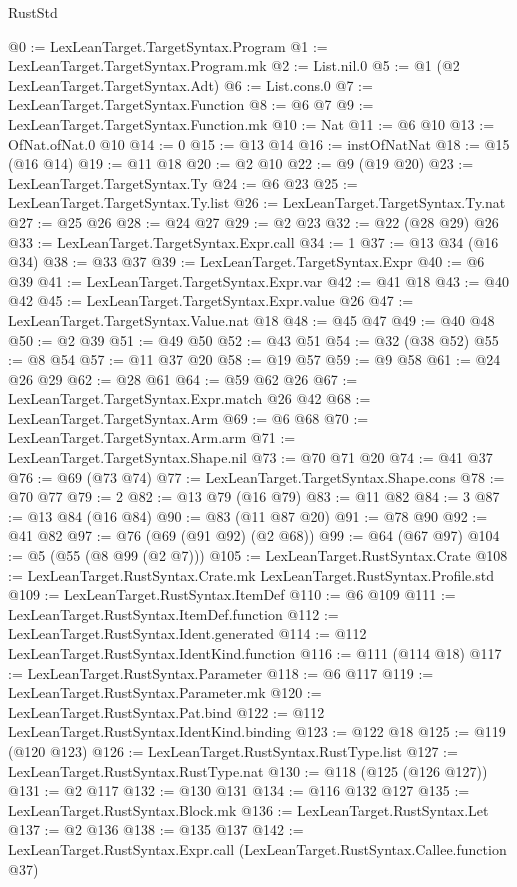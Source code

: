 \begin{lexlean}{RustStd}
\begin{coremodule}
{\begin{coremodule}
{{{{{{@0 := LexLeanTarget.TargetSyntax.Program
@1 := LexLeanTarget.TargetSyntax.Program.mk
@2 := List.nil.{0}
@5 := @1 (@2 LexLeanTarget.TargetSyntax.Adt)
@6 := List.cons.{0}
@7 := LexLeanTarget.TargetSyntax.Function
@8 := @6 @7
@9 := LexLeanTarget.TargetSyntax.Function.mk
@10 := Nat
@11 := @6 @10
@13 := OfNat.ofNat.{0} @10
@14 := 0
@15 := @13 @14
@16 := instOfNatNat
@18 := @15 (@16 @14)
@19 := @11 @18
@20 := @2 @10
@22 := @9 (@19 @20)
@23 := LexLeanTarget.TargetSyntax.Ty
@24 := @6 @23
@25 := LexLeanTarget.TargetSyntax.Ty.list
@26 := LexLeanTarget.TargetSyntax.Ty.nat
@27 := @25 @26
@28 := @24 @27
@29 := @2 @23
@32 := @22 (@28 @29) @26
@33 := LexLeanTarget.TargetSyntax.Expr.call
@34 := 1
@37 := @13 @34 (@16 @34)
@38 := @33 @37
@39 := LexLeanTarget.TargetSyntax.Expr
@40 := @6 @39
@41 := LexLeanTarget.TargetSyntax.Expr.var
@42 := @41 @18
@43 := @40 @42
@45 := LexLeanTarget.TargetSyntax.Expr.value @26
@47 := LexLeanTarget.TargetSyntax.Value.nat @18
@48 := @45 @47
@49 := @40 @48
@50 := @2 @39
@51 := @49 @50
@52 := @43 @51
@54 := @32 (@38 @52)
@55 := @8 @54
@57 := @11 @37 @20
@58 := @19 @57
@59 := @9 @58
@61 := @24 @26 @29
@62 := @28 @61
@64 := @59 @62 @26
@67 := LexLeanTarget.TargetSyntax.Expr.match @26 @42
@68 := LexLeanTarget.TargetSyntax.Arm
@69 := @6 @68
@70 := LexLeanTarget.TargetSyntax.Arm.arm
@71 := LexLeanTarget.TargetSyntax.Shape.nil
@73 := @70 @71 @20
@74 := @41 @37
@76 := @69 (@73 @74)
@77 := LexLeanTarget.TargetSyntax.Shape.cons
@78 := @70 @77
@79 := 2
@82 := @13 @79 (@16 @79)
@83 := @11 @82
@84 := 3
@87 := @13 @84 (@16 @84)
@90 := @83 (@11 @87 @20)
@91 := @78 @90
@92 := @41 @82
@97 := @76 (@69 (@91 @92) (@2 @68))
@99 := @64 (@67 @97)
@104 := @5 (@55 (@8 @99 (@2 @7)))
@105 := LexLeanTarget.RustSyntax.Crate
@108 := LexLeanTarget.RustSyntax.Crate.mk LexLeanTarget.RustSyntax.Profile.std
@109 := LexLeanTarget.RustSyntax.ItemDef
@110 := @6 @109
@111 := LexLeanTarget.RustSyntax.ItemDef.function
@112 := LexLeanTarget.RustSyntax.Ident.generated
@114 := @112 LexLeanTarget.RustSyntax.IdentKind.function
@116 := @111 (@114 @18)
@117 := LexLeanTarget.RustSyntax.Parameter
@118 := @6 @117
@119 := LexLeanTarget.RustSyntax.Parameter.mk
@120 := LexLeanTarget.RustSyntax.Pat.bind
@122 := @112 LexLeanTarget.RustSyntax.IdentKind.binding
@123 := @122 @18
@125 := @119 (@120 @123)
@126 := LexLeanTarget.RustSyntax.RustType.list
@127 := LexLeanTarget.RustSyntax.RustType.nat
@130 := @118 (@125 (@126 @127))
@131 := @2 @117
@132 := @130 @131
@134 := @116 @132 @127
@135 := LexLeanTarget.RustSyntax.Block.mk
@136 := LexLeanTarget.RustSyntax.Let
@137 := @2 @136
@138 := @135 @137
@142 := LexLeanTarget.RustSyntax.Expr.call (LexLeanTarget.RustSyntax.Callee.function @37)
}}}}}}
\end{coremodule}}
\end{coremodule}
\end{lexlean}
